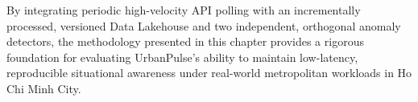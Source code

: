   By integrating periodic high-velocity API polling with an incrementally
  processed, versioned Data Lakehouse and two independent, orthogonal                                                                                     
  anomaly detectors, the methodology presented in this chapter provides
  a rigorous foundation for evaluating UrbanPulse's ability to maintain                                                                                   
  low-latency, reproducible situational awareness under real-world                                                                                        
  metropolitan workloads in Ho Chi Minh City.                                                                                                             
                                                                                                                                                          
 

